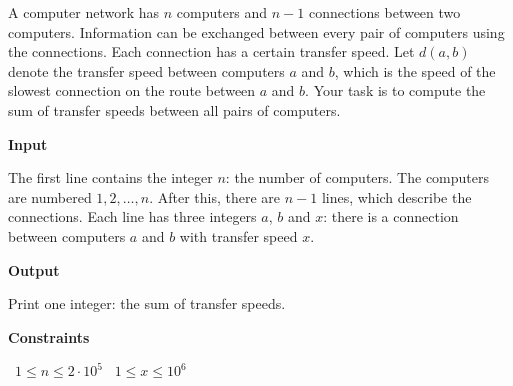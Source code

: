 A computer network has $n$ computers and $n-1$ connections between two computers. Information can be exchanged between every pair of computers using the connections.
Each connection has a certain transfer speed. Let $d(a,b)$ denote the transfer speed between computers $a$ and $b$, which is the speed of the slowest connection on the route between $a$ and $b$. Your task is to compute the sum of transfer speeds between all pairs of computers.

\vspace{0.3cm}\noindent\textbf{Input}

The first line contains the integer $n$: the number of computers. The computers are numbered $1,2,\dots,n$.
After this, there are $n-1$ lines, which describe the connections. Each line has three integers $a$, $b$ and $x$: there is a connection between computers $a$ and $b$ with transfer speed $x$.

\vspace{0.3cm}\noindent\textbf{Output}

Print one integer: the sum of transfer speeds.

\vspace{0.3cm}\noindent\textbf{Constraints}

\textbullet\ $1 \le n \le 2 \cdot 10^5$
\textbullet\ $1 \le x \le 10^6$